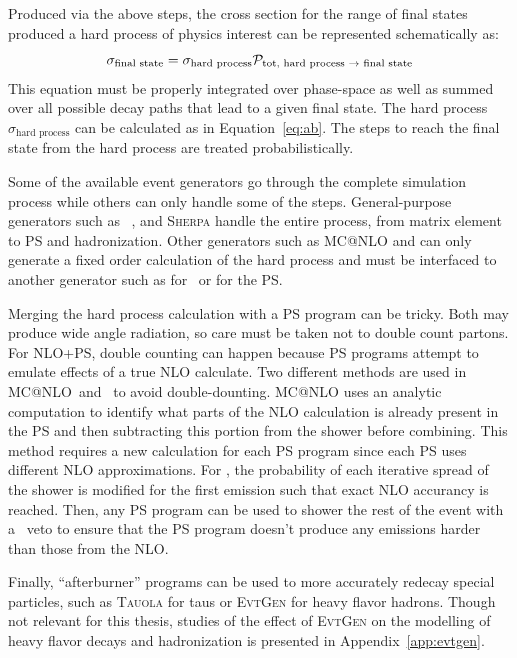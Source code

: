 Produced via the above steps, the cross section for the range of final states produced a hard process of physics interest can be represented schematically as:
\begin{equation}
\sigma_{\text{final state}}=\sigma_{\text{hard process}} \mathcal{P}_{\text{tot, hard process \rarrow final state}}
\label{eq:finalst}
\end{equation}
This equation must be properly integrated over phase-space as well as summed over all possible decay paths that lead to a given final state. The hard process $\sigma_{\text{hard process}}$ can be calculated as in Equation~\ref{eq:ab}. The steps to reach the final state from the hard process are treated probabilistically.


Some of the available event generators go through the complete simulation process while others can only handle some of the steps. General-purpose generators such as \py\, \hw, and \textsc{Sherpa} handle the entire process, from matrix element to PS and hadronization. Other generators such as \textsc{MC@NLO}\cite{mcatnlo,mcatnlo2} and \pow \cite{Powheg,Powheg2,Powheg3,Powheg4} can only generate a fixed order calculation of the hard process and must be interfaced to another generator such as for \py\ or \hw for the PS. 

Merging the hard process calculation with a PS program can be tricky. Both may produce wide angle radiation, so care must be taken not to double count partons. For NLO+PS, double counting can happen because PS programs attempt to emulate effects of a true NLO calculate. Two different methods are used in \textsc{MC@NLO}\ and \pow\ to avoid double-dounting. \textsc{MC@NLO} uses an analytic computation to identify what parts of the NLO calculation is already present in the PS and then subtracting this portion from the shower before combining. This method requires a new calculation for each PS program since each PS uses different NLO approximations. For \pow, the probability of each iterative spread of the shower is modified for the first emission such that exact NLO accurancy is reached. Then, any PS program can be used to shower the rest of the event with a \pt\ veto to ensure that the PS program doesn't produce any emissions harder than those from the NLO.

Finally, ``afterburner'' programs can be used to more accurately redecay special particles, such as \textsc{Tauola} for taus\cite{Jadach:1993hs} or \textsc{EvtGen} for heavy flavor hadrons\cite{Lange:2001uf}. Though not relevant for this thesis, studies of the effect of \textsc{EvtGen} on the modelling of heavy flavor decays and hadronization is presented in Appendix~\ref{app:evtgen}.

